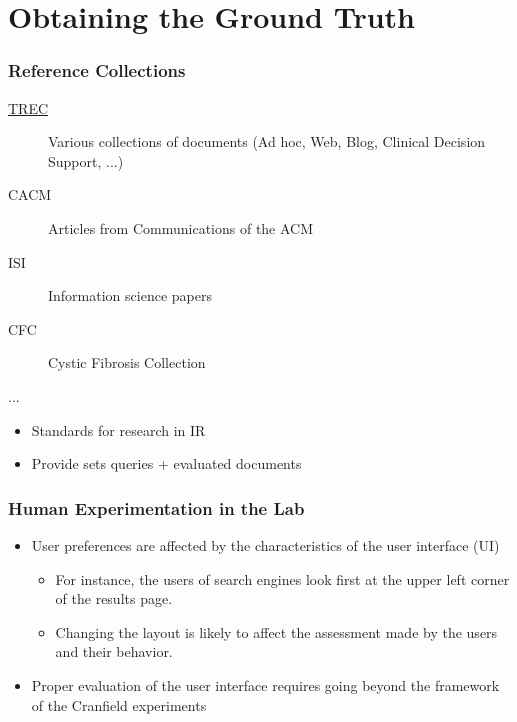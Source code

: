 \documentclass[svgnames]{beamer}
\begin{document}

\section{Obtaining the Ground Truth}

\begin{frame}
  \frametitle{Reference Collections}

  \begin{block}{}
    \begin{description}
    \item[\href{http://trec.nist.gov/data.html}{TREC}] Various collections of
        documents (Ad hoc, Web, Blog, Clinical Decision Support, ...)
    \item[CACM] Articles from Communications of the ACM
    \item[ISI] Information science papers
    \item[CFC] Cystic Fibrosis Collection
    \item[...]
    \end{description}
  \end{block}

  \begin{block}{}
    \begin{itemize}
    \item Standards for research in IR
    \item Provide sets queries + evaluated documents
    \end{itemize}
  \end{block}
\end{frame}


\begin{frame}
  \frametitle{Human Experimentation in the Lab}

\begin{itemize}
\item User preferences are affected by the characteristics of the user interface (UI)
\begin{itemize} 
\item For instance, the users of search engines look
  first at the upper left corner of the results page. 
\item Changing the layout is likely to affect the assessment
  made by the users and their behavior.
\end{itemize}
\item Proper evaluation of the user interface requires going beyond
  the framework of the Cranfield experiments
\end{itemize}


\end{frame}
\end{document}
